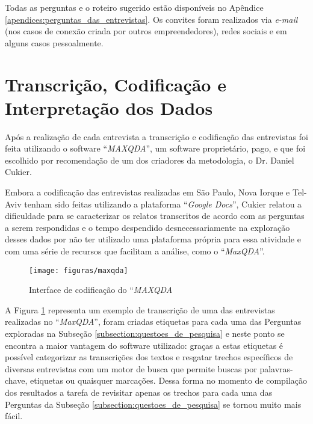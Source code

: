 Todas as perguntas e o roteiro sugerido estão disponíveis no Apêndice \ref{apendices:perguntas_das_entrevistas}. Os convites foram realizados via \textit{e-mail} (nos casos de conexão criada por outros empreendedores), redes sociais e em alguns casos pessoalmente. 

\section{Transcrição, Codificação e Interpretação dos Dados}
\label{subsection:codificacao_e_interpretacao_dos_dados}

Após a realização de cada entrevista a transcrição e codificação das entrevistas foi feita utilizando o software ``\textit{MAXQDA}'', um software proprietário, pago, e que foi escolhido por recomendação de um dos criadores da metodologia, o Dr. Daniel Cukier. 

Embora a codificação das entrevistas realizadas em São Paulo, Nova Iorque e Tel-Aviv tenham sido feitas utilizando a plataforma ``\textit{Google Docs}'', Cukier relatou a dificuldade para se caracterizar os relatos transcritos de acordo com as perguntas a serem respondidas e o tempo despendido desnecessariamente na exploração desses dados por não ter utilizado uma plataforma própria para essa atividade e com uma série de recursos que facilitam a análise, como o ``\textit{MaxQDA}''.

\begin{figure}[!htb]
	\centering
	\texttt{[image: figuras/maxqda]}
	\caption{Interface de codificação do ``\textit{MAXQDA}}
	\label{figure:maxqda}
\end{figure}

A Figura \ref{figure:maxqda} representa um exemplo de transcrição de uma das entrevistas realizadas no ``\textit{MaxQDA}'', foram criadas etiquetas para cada uma das Perguntas exploradas na Subseção \ref{subsection:questoes_de_pesquisa} e neste ponto se encontra a maior vantagem do software utilizado: graças a estas etiquetas é possível categorizar as transcrições dos textos e resgatar trechos específicos de diversas entrevistas com um motor de busca que permite buscas por palavras-chave, etiquetas ou quaisquer marcações. Dessa forma no momento de compilação dos resultados a tarefa de revisitar apenas os trechos para cada uma das Perguntas da Subseção \ref{subsection:questoes_de_pesquisa} se tornou muito mais fácil.